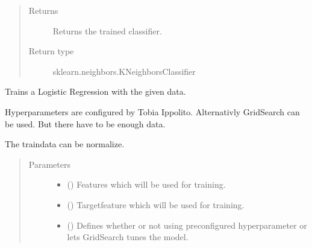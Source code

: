 \documentclass[letterpaper,10pt,english]{sphinxmanual}
\begin{document}
\begin{fulllineitems}
\begin{quote}
\begin{description}
\begin{itemize}
\end{itemize}

\item[{Returns}] \leavevmode
\sphinxAtStartPar
Returns the trained classifier.

\item[{Return type}] \leavevmode
\sphinxAtStartPar
sklearn.neighbors.KNeighborsClassifier

\end{description}\end{quote}

\end{fulllineitems}


\begin{fulllineitems}
\label{\detokenize{anoog.model:anoog.model.model.train_logistic_regression}}
\sphinxAtStartPar
Trains a Logistic Regression with the given data.

\sphinxAtStartPar
Hyperparameters are configured by Tobia Ippolito. Alternativly GridSearch can be used. But there have to be enough data.

\sphinxAtStartPar
The traindata can be normalize.
\begin{quote}\begin{description}
\item[{Parameters}] \leavevmode\begin{itemize}
\item {} 
\sphinxAtStartPar
{} () \textendash{} Features which will be used for training.

\item {} 
\sphinxAtStartPar
{} () \textendash{} Target\sphinxhyphen{}feature which will be used for training.

\item {} 
\sphinxAtStartPar
{} (\sphinxstyleliteralemphasis{\sphinxupquote{, }}) \textendash{} Defines whether or not using preconfigured hyperparameter or lets GridSearch tunes the model.


\end{itemize}
\end{description}
\end{quote}
\end{fulllineitems}
\end{document}
